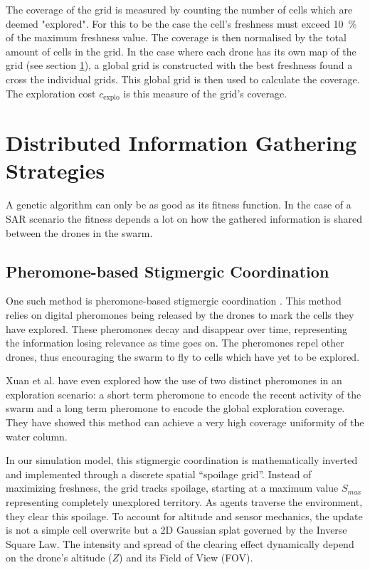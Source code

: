 \documentclass[conference]{IEEEtran}
\begin{document}
The coverage of the grid is measured by counting the number of cells which are deemed "explored". For this to be the case the cell's freshness must exceed \SI{10}{\%} of the maximum freshness value. The coverage is then normalised by the total amount of cells in the grid. In the case where each drone has its own map of the grid (see section \ref{sec:information}), a global grid is constructed with the best freshness found a cross the individual grids. This global grid is then used to calculate the coverage. The exploration cost $c_{\text{explo}}$ is this measure of the grid's coverage.

\clearpage
\section{Distributed Information Gathering Strategies}
\label{sec:information}

A genetic algorithm can only be as good as its fitness function. In the case of a SAR scenario the fitness depends a lot on how the gathered information is shared between the drones in the swarm.

\subsection{Pheromone-based Stigmergic Coordination}
One such method is pheromone-based stigmergic coordination \cite{devaraju_connectivity-aware_2023, xuan_dual-trail_2026}. This method relies on digital pheromones being released by the drones to mark the cells they have explored. These pheromones decay and disappear over time, representing the information losing relevance as time goes on. The pheromones repel other drones, thus encouraging the swarm to fly to cells which have yet to be explored.

Xuan et al. \cite{xuan_dual-trail_2026} have even explored how the use of two distinct pheromones in an exploration scenario: a short term pheromone to encode the recent activity of the swarm and a long term pheromone to encode the global exploration coverage. They have showed this method can achieve a very high coverage uniformity of the water column.

In our simulation model, this stigmergic coordination is mathematically inverted and implemented through a discrete spatial ``spoilage grid''. Instead of maximizing freshness, the grid tracks spoilage, starting at a maximum value $S_{max}$ representing completely unexplored territory. As agents traverse the environment, they clear this spoilage. To account for altitude and sensor mechanics, the update is not a simple cell overwrite but a 2D Gaussian splat governed by the Inverse Square Law. The intensity and spread of the clearing effect dynamically depend on the drone's altitude ($Z$) and its Field of View (FOV). 
\end{document}

